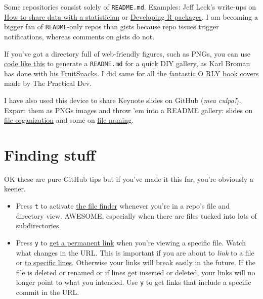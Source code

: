 \documentclass[
]{book}
\providecommand{\tightlist}{%
  \setlength{\itemsep}{0pt}\setlength{\parskip}{0pt}}
\begin{document}
Some repositories consist solely of \texttt{README.md}. Examples: Jeff Leek's write-ups on \href{https://github.com/jtleek/datasharing}{How to share data with a statistician} or \href{https://github.com/jtleek/rpackages}{Developing R packages}. I am becoming a bigger fan of \texttt{README}-only repos than gists because repo issues trigger notifications, whereas comments on gists do not.

If you've got a directory full of web-friendly figures, such as PNGs, you can use \href{https://gist.github.com/jennybc/0239f65633e09df7e5f4}{code like this} to generate a \texttt{README.md} for a quick DIY gallery, as Karl Broman has done with \href{https://github.com/kbroman/FruitSnacks/blob/master/PhotoGallery.md}{his FruitSnacks}. I did same for all the \href{https://github.com/jennybc/orly-full-res\#readme}{fantastic O RLY book covers} made by The Practical Dev.

I have also used this device to share Keynote slides on GitHub (\emph{mea culpa!}). Export them as PNGs images and throw 'em into a README gallery: slides on \href{https://github.com/Reproducible-Science-Curriculum/rr-organization1/tree/27883c8fc4cdd4dcc6a8232f1fe5c726e96708a0/slides/organization-slides}{file organization} and some on \href{https://github.com/Reproducible-Science-Curriculum/rr-organization1/tree/27883c8fc4cdd4dcc6a8232f1fe5c726e96708a0/slides/naming-slides}{file naming}.

\section{Finding stuff}\label{finding-stuff}

OK these are pure GitHub tips but if you've made it this far, you're obviously a keener.

\begin{itemize}
\tightlist
\item
  Press \texttt{t} to activate \href{https://github.com/blog/793-introducing-the-file-finder}{the file finder} whenever you're in a repo's file and directory view. AWESOME, especially when there are files tucked into lots of subdirectories.
\item
  Press \texttt{y} to \href{https://help.github.com/articles/getting-permanent-links-to-files/}{get a permanent link} when you're viewing a specific file. Watch what changes in the URL. This is important if you are about to \emph{link} to a file or \href{http://stackoverflow.com/questions/23821235/how-to-link-to-specific-line-number-on-github}{to specific lines}. Otherwise your links will break easily in the future. If the file is deleted or renamed or if lines get inserted or deleted, your links will no longer point to what you intended. Use \texttt{y} to get links that include a specific commit in the URL.
\end{itemize}
\end{document}
